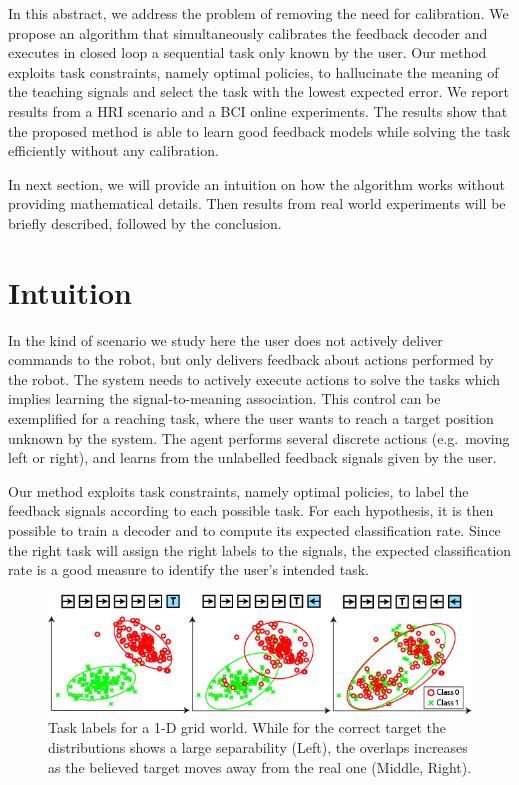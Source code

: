 \documentclass[conference]{IEEEtran}
\begin{document}
In this abstract, we address the problem of removing the need for calibration. We propose an algorithm that simultaneously calibrates the feedback decoder and executes in closed loop a sequential task only known by the user. Our method exploits task constraints, namely optimal policies, to hallucinate the meaning of the teaching signals and select the task with the lowest expected error. We report results from a HRI scenario and a BCI online experiments. The results show that the proposed method is able to learn good feedback models while solving the task efficiently without any calibration.

In next section, we will provide an intuition on how the algorithm works without providing mathematical details. Then results from real world experiments will be briefly described, followed by the conclusion.

\section{Intuition}

In the kind of scenario we study here the user does not actively deliver commands to the robot, but only delivers feedback about actions performed by the robot. The system needs to actively execute actions to solve the tasks which implies learning the signal-to-meaning association. This control can be exemplified for a reaching task, where the user wants to reach a target position unknown by the system. The agent performs several discrete actions (e.g.\ moving left or right), and learns from the unlabelled feedback signals given by the user.

Our method exploits task constraints, namely optimal policies, to label the feedback signals according to each possible task. For each hypothesis, it is then possible to train a decoder and to compute its expected classification rate. Since the right task will assign the right labels to the signals, the expected classification rate is a good measure to identify the user's intended task. 

\begin{figure}[!h]%
\centering
\includegraphics[width=0.85\columnwidth]{images/real_vs_fake}
\caption{Task labels for a 1-D grid world. While for the correct target the distributions shows a large separability (Left), the overlaps increases as the believed target moves away from the real one (Middle, Right). }
\label{fig:GM}
\end{figure}
\end{document}
